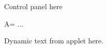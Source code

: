 \documentclass{ximera}
\begin{document}
Control panel here

A= ...


Dynamic text from applet here.
\end{document}
